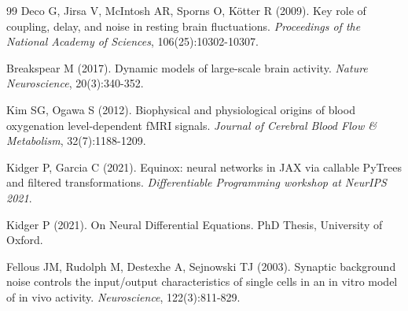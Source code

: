 \documentclass[11pt,a4paper]{article}
\begin{document}
\begin{thebibliography}{99}
Deco G, Jirsa V, McIntosh AR, Sporns O, Kötter R (2009). Key role of coupling, delay, and noise in resting brain fluctuations. \emph{Proceedings of the National Academy of Sciences}, 106(25):10302-10307.

Breakspear M (2017). Dynamic models of large-scale brain activity. \emph{Nature Neuroscience}, 20(3):340-352.

Kim SG, Ogawa S (2012). Biophysical and physiological origins of blood oxygenation level-dependent fMRI signals. \emph{Journal of Cerebral Blood Flow \& Metabolism}, 32(7):1188-1209.

Kidger P, Garcia C (2021). Equinox: neural networks in JAX via callable PyTrees and filtered transformations. \emph{Differentiable Programming workshop at NeurIPS 2021}.

Kidger P (2021). On Neural Differential Equations. PhD Thesis, University of Oxford.

Fellous JM, Rudolph M, Destexhe A, Sejnowski TJ (2003). Synaptic background noise controls the input/output characteristics of single cells in an in vitro model of in vivo activity. \emph{Neuroscience}, 122(3):811-829.

\end{thebibliography}
\end{document}
